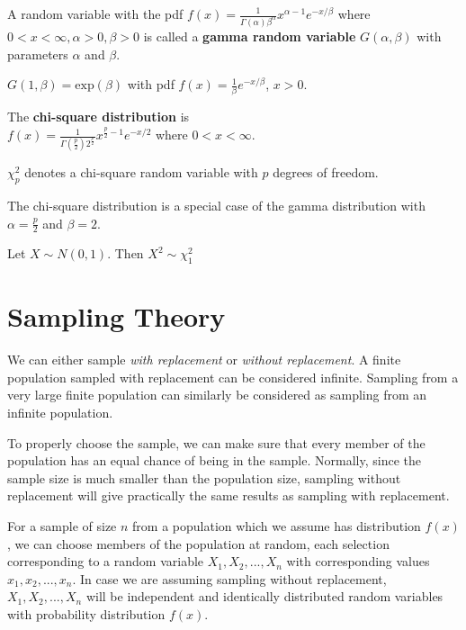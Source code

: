 \begin{defn}
    A random variable with the pdf $f(x) = \displaystyle  \frac{1}{\Gamma(\alpha) \beta^\alpha} x^{\alpha - 1} e^{-x/\beta}$ where $0 < x < \infty, \alpha > 0, \beta > 0$ is called a \textbf{gamma random variable} $G(\alpha, \beta)$ with parameters $\alpha$ and $\beta$. 
\end{defn}
$G(1, \beta) = \text{exp}(\beta)$ with pdf $f(x) = \frac{1}{\beta} e^{-x/\beta}$, $x > 0$.

\begin{defn}
    The \textbf{chi-square distribution} is \\
    $f(x) = \displaystyle \frac{1}{\Gamma(\frac{p}{2}) 2^{\frac{p}{2}}} x^{\frac{p}{2} - 1} e ^{-x/2}$ where $0 < x < \infty$.

    \vspace{0.5cm}
    $\chi_p^2$ denotes a chi-square random variable with $p$ degrees of freedom.
\end{defn}

The chi-square distribution is a special case of the gamma distribution with $\alpha = \frac{p}{2}$ and $\beta = 2$.

Let $X \sim N(0,1)$. Then $X^2 \sim \chi_1^2$

\section{Sampling Theory}
We can either sample \textit{with replacement} or \textit{without replacement}. A finite population sampled with replacement can be considered infinite. Sampling from a very large finite population can similarly be considered as sampling from an infinite population. 

To properly choose the sample, we can make sure that every member of the population has an equal chance of being in the sample.
Normally, since the sample size is much smaller than the population size, sampling without replacement will give practically the same results as sampling with replacement.

For a sample of size $n$ from a population which we assume has distribution $f(x)$, we can choose members of the population at random, each selection corresponding to a random variable $X_1, X_2, ..., X_n$ with corresponding values $x_1, x_2, ..., x_n$. In case we are assuming sampling without replacement, $X_1, X_2, ..., X_n$ will be independent and identically distributed random variables with probability distribution $f(x)$.

